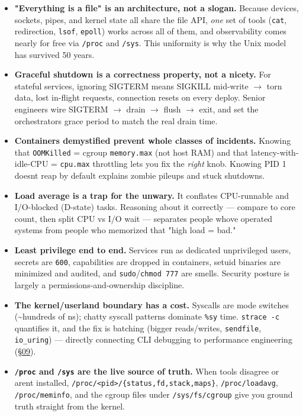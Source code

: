 \documentclass[11pt]{article}
\begin{document}
\begin{itemize}
\item
  \textbf{"Everything is a file" is an architecture, not a slogan.} Because devices, sockets, pipes, and kernel state all share the file API, \emph{one} set of tools (\texttt{cat}, redirection, \texttt{lsof}, \texttt{epoll}) works across all of them, and observability comes nearly for free via \texttt{/proc} and \texttt{/sys}. This uniformity is why the Unix model has survived 50 years.
\item
  \textbf{Graceful shutdown is a correctness property, not a nicety.} For stateful services, ignoring SIGTERM means SIGKILL mid-write \(\rightarrow\) torn data, lost in-flight requests, connection resets on every deploy. Senior engineers wire SIGTERM \(\rightarrow\) drain \(\rightarrow\) flush \(\rightarrow\) exit, and set the orchestrator\textquotesingle s grace period to match the real drain time.
\item
  \textbf{Containers demystified prevent whole classes of incidents.} Knowing that \texttt{OOMKilled} = cgroup \texttt{memory.max} (not host RAM) and that latency-with-idle-CPU = \texttt{cpu.max} throttling lets you fix the \emph{right} knob. Knowing PID 1 doesn\textquotesingle t reap by default explains zombie pileups and stuck shutdowns.
\item
  \textbf{Load average is a trap for the unwary.} It conflates CPU-runnable and I/O-blocked (D-state) tasks. Reasoning about it correctly --- compare to core count, then split CPU vs I/O wait --- separates people who\textquotesingle ve operated systems from people who memorized that "high load = bad."
\item
  \textbf{Least privilege end to end.} Services run as dedicated unprivileged users, secrets are \texttt{600}, capabilities are dropped in containers, setuid binaries are minimized and audited, and \texttt{sudo}/\texttt{chmod\ 777} are smells. Security posture is largely a permissions-and-ownership discipline.
\item
  \textbf{The kernel/userland boundary has a cost.} Syscalls are mode switches (\textasciitilde hundreds of ns); chatty syscall patterns dominate \texttt{\%sy} time. \texttt{strace\ -c} quantifies it, and the fix is batching (bigger reads/writes, \texttt{sendfile}, \texttt{io\_uring}) --- directly connecting CLI debugging to performance engineering (\hyperlink{section.09}{\textcolor{acc}{§09}}).
\item
  \textbf{\texttt{/proc} and \texttt{/sys} are the live source of truth.} When tools disagree or aren\textquotesingle t installed, \texttt{/proc/\textless{}pid\textgreater{}/\{status,fd,stack,maps\}}, \texttt{/proc/loadavg}, \texttt{/proc/meminfo}, and the cgroup files under \texttt{/sys/fs/cgroup} give you ground truth straight from the kernel.
\end{itemize}
\end{document}
